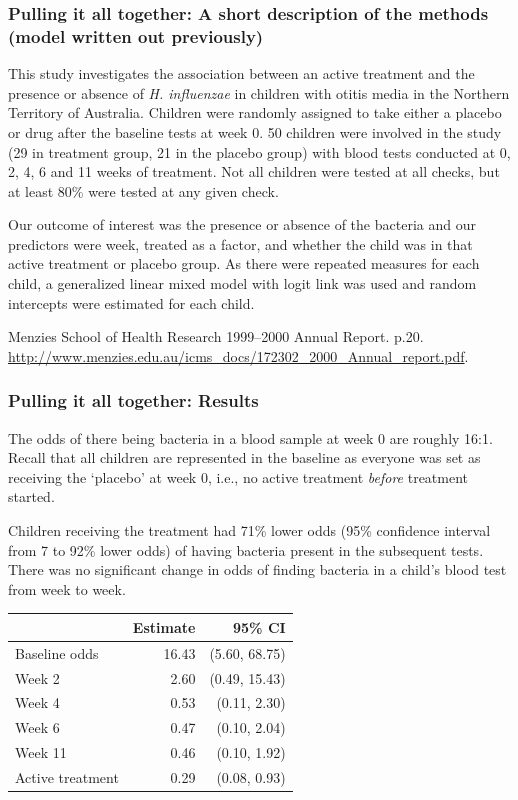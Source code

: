 \documentclass[
  openany]{book}
\begin{document}
\hypertarget{pulling-it-all-together-a-short-description-of-the-methods-model-written-out-previously}{%
\subsubsection{Pulling it all together: A short description of the methods (model written out previously)}\label{pulling-it-all-together-a-short-description-of-the-methods-model-written-out-previously}}

This study investigates the association between an active treatment and the presence or absence of \emph{H. influenzae} in children with otitis media in the Northern Territory of Australia. Children were randomly assigned to take either a placebo or drug after the baseline tests at week 0. 50 children were involved in the study (29 in treatment group, 21 in the placebo group) with blood tests conducted at 0, 2, 4, 6 and 11 weeks of treatment. Not all children were tested at all checks, but at least 80\% were tested at any given check.

Our outcome of interest was the presence or absence of the bacteria and our predictors were week, treated as a factor, and whether the child was in that active treatment or placebo group. As there were repeated measures for each child, a generalized linear mixed model with logit link was used and random intercepts were estimated for each child.

Menzies School of Health Research 1999--2000 Annual Report. p.20. \url{http://www.menzies.edu.au/icms_docs/172302_2000_Annual_report.pdf}.

\hypertarget{pulling-it-all-together-results}{%
\subsubsection{Pulling it all together: Results}\label{pulling-it-all-together-results}}

The odds of there being bacteria in a blood sample at week 0 are roughly 16:1. Recall that all children are represented in the baseline as everyone was set as receiving the `placebo' at week 0, i.e., no active treatment \emph{before} treatment started.

Children receiving the treatment had 71\% lower odds (95\% confidence interval from 7 to 92\% lower odds) of having bacteria present in the subsequent tests. There was no significant change in odds of finding bacteria in a child's blood test from week to week.

\begin{tabular}{l|r|r}
\hline
  & Estimate & 95\% CI\\
\hline
Baseline odds & 16.43 & (5.60, 68.75)\\
\hline
Week 2 & 2.60 & (0.49, 15.43)\\
\hline
Week 4 & 0.53 & (0.11,  2.30)\\
\hline
Week 6 & 0.47 & (0.10,  2.04)\\
\hline
Week 11 & 0.46 & (0.10,  1.92)\\
\hline
Active treatment & 0.29 & (0.08,  0.93)\\
\hline
\end{tabular}
\end{document}

